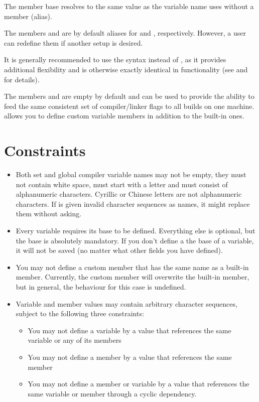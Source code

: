The member base resolves to the same value as the variable name uses without a member (alias).

The members  and  are by default aliases for  and , respectively. However, a user can redefine them if another setup is desired.

It is generally recommended to use the syntax  instead of , as it provides additional flexibility and is otherwise exactly identical in functionality (see  and  for details).

The members  and  are empty by default and can be used to provide the ability to feed the same consistent set of compiler/linker flags to all builds on one machine. \codeblocks allows you to define custom variable members in addition to the built-in ones.

\section{Constraints}

\begin{itemize}
\item Both set and global compiler variable names may not be empty, they must not contain white space, must start with a letter and must consist of alphanumeric characters. Cyrillic or Chinese letters are not alphanumeric characters. If \codeblocks is given invalid character sequences as names, it might replace them without asking.
\item Every variable requires its base to be defined. Everything else is optional, but the base is absolutely mandatory. If you don't define a the base of a variable, it will not be saved (no matter what other fields you have defined).
\item You may not define a custom member that has the same name as a built-in member. Currently, the custom member will overwrite the built-in member, but in general, the behaviour for this case is undefined.
\item Variable and member values may contain arbitrary character sequences, subject to the following three constraints:
\begin{itemize}
\item You may not define a variable by a value that references the same variable or any of its members
\item You may not define a member by a value that references the same member
\item You may not define a member or variable by a value that references the same variable or member through a cyclic dependency.
\end{itemize}
\end{itemize}

